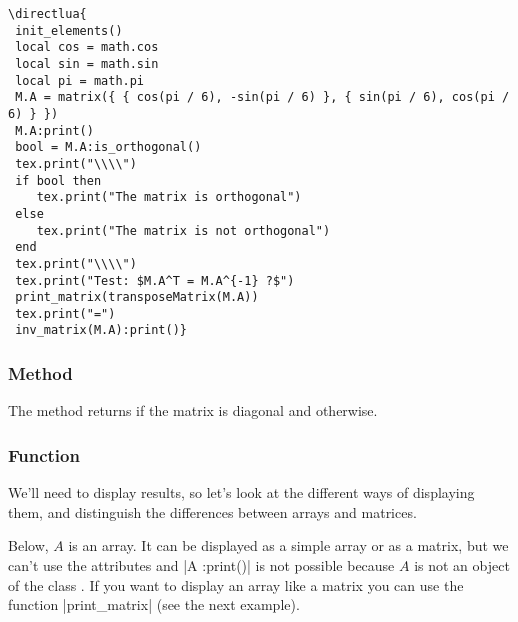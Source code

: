 \begin{verbatim}
\directlua{
 init_elements()
 local cos = math.cos
 local sin = math.sin
 local pi = math.pi
 M.A = matrix({ { cos(pi / 6), -sin(pi / 6) }, { sin(pi / 6), cos(pi / 6) } })
 M.A:print()
 bool = M.A:is_orthogonal()
 tex.print("\\\\")
 if bool then
 	tex.print("The matrix is orthogonal")
 else
 	tex.print("The matrix is not orthogonal")
 end
 tex.print("\\\\")
 tex.print("Test: $M.A^T = M.A^{-1} ?$")
 print_matrix(transposeMatrix(M.A))
 tex.print("=")
 inv_matrix(M.A):print()}
\end{verbatim}


\subsubsection{Method }
\label{ssub:method_is_diagonal}

The method returns  if the matrix is diagonal and  otherwise.

\subsubsection{Function }
\label{ssub:display_a_table_or_array_function_code_print_array}

We'll need to display results, so let's look at the different ways of displaying them, and distinguish the differences between arrays and matrices.

Below, $A$ is an array. It can be displayed as a simple array or as a matrix, but we can't use the attributes and |A :print()| is not possible because $A$ is not an object of the class . If you want to display an array like a matrix you can use the function |print_matrix| (see  the next example).

